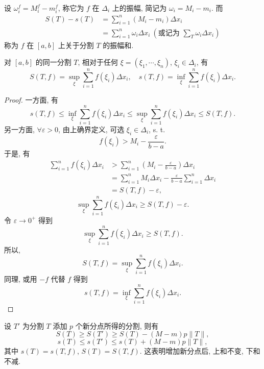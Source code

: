 设 $\omega_{i}^{f}=M_{i}^{f}-m_{i}^{f}$, 称它为 $f$ 在 $\Delta_{i}$ 上的振幅, 简记为 $\omega_{i}=M_{i}-m_{i}$. 而
\begin{align*}
S(T)-s(T)&=\sum_{i=1}^{n}(M_{i}-m_{i})\Delta x_{i}\\
&=\sum_{i=1}^{n}\omega_{i}\Delta x_{i}\ \left(\text{或记为 }\sum_{T}\omega_{i}\Delta x_{i}\right)
\end{align*}
称为 $f$ 在 $[a,b]$ 上关于分割 $T$ 的振幅和.

\begin{lemma}\label{lem:6.1.1}
对 $[a,b]$ 的同一分割 $T$, 相对于任何 $\xi=(\xi_{1},\cdots,\xi_{n})$, $\xi_{i}\in\Delta_{i}$, 有
\[
S(T,f)=\sup_{\xi}\sum_{i=1}^{n}f(\xi_{i})\Delta x_{i},\quad s(T,f)=\inf_{\xi}\sum_{i=1}^{n}f(\xi_{i})\Delta x_{i}.
\]
\end{lemma}

\begin{proof}
一方面, 有
\[
s(T,f)\leqslant\inf_{\xi}\sum_{i=1}^{n}f(\xi_{i})\Delta x_{i}\leqslant\sup_{\xi}\sum_{i=1}^{n}f(\xi_{i})\Delta x_{i}\leqslant S(T,f).
\]
另一方面, $\forall\varepsilon>0$, 由上确界定义, 可选 $\xi_{i}\in\Delta_{i}$, s. t.
\[
f(\xi_{i})>M_{i}-\frac{\varepsilon}{b-a}.
\]
于是, 有
\begin{align*}
\sum_{i=1}^{n}f(\xi_{i})\Delta x_{i}&>\sum_{i=1}^{n}\left(M_{i}-\frac{\varepsilon}{b-a}\right)\Delta x_{i}\\
&=\sum_{i=1}^{n}M_{i}\Delta x_{i}-\frac{\varepsilon}{b-a}\sum_{i=1}^{n}\Delta x_{i}\\
&=S(T,f)-\varepsilon,
\end{align*}
\[
\sup_{\xi}\sum_{i=1}^{n}f(\xi_{i})\Delta x_{i}\geqslant S(T,f)-\varepsilon.
\]
令 $\varepsilon\to 0^{+}$ 得到
\[
\sup_{\xi}\sum_{i=1}^{n}f(\xi_{i})\Delta x_{i}\geqslant S(T,f).
\]
所以,
\[
S(T,f)=\sup_{\xi}\sum_{i=1}^{n}f(\xi_{i})\Delta x_{i}.
\]
同理, 或用 $-f$ 代替 $f$ 得到
\[
s(T,f)=\inf_{\xi}\sum_{i=1}^{n}f(\xi_{i})\Delta x_{i}.
\]
\end{proof}

\begin{lemma}\label{lem:6.1.2}
设 $T'$ 为分割 $T$ 添加 $p$ 个新分点所得的分割, 则有
\[
S(T)\geqslant S(T')\geqslant S(T)-(M-m)p\|T\|,
\]
\[
s(T)\leqslant s(T')\leqslant s(T)+(M-m)p\|T\|,
\]
其中 $s(T)=s(T,f)$, $S(T)=S(T,f)$. 这表明增加新分点后, 上和不变, 下和不减.
\end{lemma}


